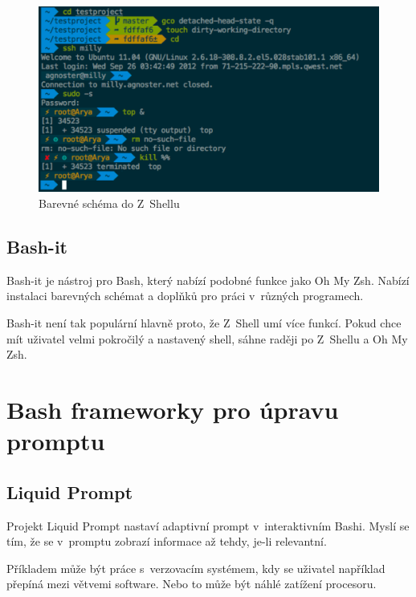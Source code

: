 \documentclass[thesis=M,czech]{FITthesis}[2012/06/26]
\begin{document}
\begin{figure}[htb]\centering
	\includegraphics[width=\textwidth]{./images/zsh_theme}
	\caption{Barevné schéma do Z~Shellu \cite{ohmyzshimg}}
	\label{fig:zsh_theme}
\end{figure}



%
%
%
\subsection{Bash-it}

Bash-it \cite{bashit} je nástroj pro Bash, který nabízí podobné funkce jako Oh My Zsh. Nabízí instalaci barevných schémat a doplňků pro práci v~různých programech.

Bash-it není tak populární hlavně proto, že Z~Shell umí více funkcí. Pokud chce mít uživatel velmi pokročilý a nastavený shell, sáhne raději po Z~Shellu a Oh My Zsh.


%

%
%
%
\section{Bash frameworky pro úpravu promptu}

\subsection{Liquid Prompt}

Projekt Liquid Prompt \cite{liquidprompt} nastaví adaptivní prompt v~interaktivním Bashi. Myslí se tím, že se v~promptu zobrazí informace až tehdy, je-li relevantní.

Příkladem může být práce s~verzovacím systémem, kdy se uživatel například přepíná mezi větvemi software. Nebo to může být náhlé zatížení procesoru.
\end{document}

